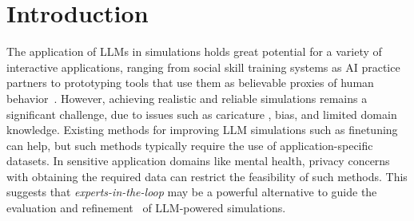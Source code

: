 \documentclass[11pt]{article}
\begin{document}
\begin{abstract}
\end{abstract}

\section{Introduction}


The application of LLMs in simulations holds great potential for a variety of interactive applications, ranging from social skill training systems as AI practice partners \cite{yang2024social} to prototyping tools that use them as believable proxies of human behavior~\cite{park2022social}. However, achieving realistic and reliable simulations remains a significant challenge, due to issues such as caricature \cite{cheng-etal-2023-compost}, bias, and limited domain knowledge. 
Existing methods for improving LLM simulations such as finetuning~\cite{demasi-etal-2020-multi} can help, but such methods typically require the use of application-specific datasets. In sensitive application domains like mental health, privacy concerns with obtaining the required data can restrict the feasibility of such methods. This suggests that \textit{experts-in-the-loop} may be a powerful alternative to guide the evaluation and refinement~\cite{chen2023llmempowered} of LLM-powered simulations. 
\end{document}
